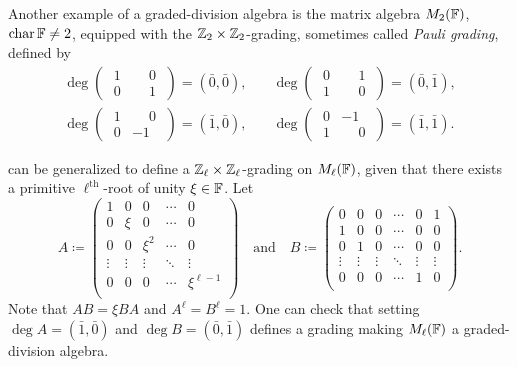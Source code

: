 \begin{ex}\label{ex:Pauli-2x2}
    Another example of a graded-division algebra is the matrix algebra $M_2(\mathbb{F})$, $\operatorname{char} \mathbb{F} \neq 2$, equipped with the $\mathbb{Z}_2 \times \mathbb{Z}_2$-grading, sometimes called \emph{Pauli grading}, defined by
\begin{align*}
	\deg \begin{pmatrix}
		\phantom{.}1 & \phantom{-}0\phantom{.} \\
		\phantom{.}0 & \phantom{-}1\phantom{.}
	\end{pmatrix} = (\bar 0, \bar 0),\quad & \deg \begin{pmatrix}
		\phantom{.}0 & \phantom{-}1\phantom{.} \\
		\phantom{.}1 & \phantom{-}0\phantom{.}
	\end{pmatrix} = (\bar 0, \bar 1), \\
	\deg \begin{pmatrix}
		\phantom{.}1 & \phantom{-}0\phantom{.} \\
		\phantom{.}0 & -1\phantom{.}
	\end{pmatrix} = (\bar 1, \bar 0),\quad &
	\deg \begin{pmatrix}
		\phantom{.}0 & -1\phantom{.}           \\
		\phantom{.}1 & \phantom{-}0\phantom{.}
	\end{pmatrix} = (\bar 1, \bar 1).
\end{align*}
\end{ex}

\begin{ex}\label{ex:Pauli-ell-x-ell}
     can be generalized to define a $\mathbb{Z}_\ell \times \mathbb{Z}_\ell$-grading on $M_\ell(\mathbb{F})$,  given that there exists a primitive $\ell^{\text{th}}$-root of unity $\xi \in \mathbb{F}$. 
    Let
    \[
        A \coloneqq \begin{pmatrix}
		1 & 0 & 0 & \cdots &0\\
		0 & \xi& 0 & \cdots &0\\
		0 & 0 & \xi^2 &\cdots &0\\
		\vdots & \vdots & \vdots & \ddots  & \vdots\\
		0 & 0 & 0 & \cdots & \xi^{\ell-1}\\
	\end{pmatrix}
        \quad \text{and} \quad
        B \coloneqq \begin{pmatrix}
		0 & 0 & 0 & \cdots & 0 & 1\\
		1 & 0& 0 & \cdots & 0 & 0\\
		0 & 1 & 0 &\cdots & 0 & 0\\
		\vdots & \vdots & \vdots & \ddots & \vdots & \vdots\\
		0 & 0 & 0 & \cdots & 1 & 0\\
	\end{pmatrix}.
    \] 
    Note that $AB = \xi BA$ and $A^\ell = B^\ell = 1$. 
    One can check that setting $\deg A = (\bar 1, \bar 0)$ and $\deg B = (\bar 0, \bar 1)$ defines a grading making $M_\ell (\mathbb{F})$ a graded-division algebra.
\end{ex}

